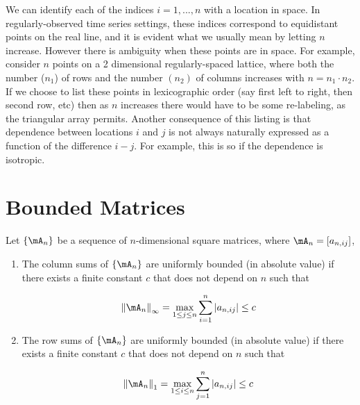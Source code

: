 We can identify each of the indices $i = 1,...,n$ with a location in space. In regularly-observed time series settings, these indices correspond to equidistant points on the real line, and it is evident what we usually mean by letting $n$ increase. However there is ambiguity when these points are in space. For example, consider $n$ points on a 2 dimensional regularly-spaced lattice, where both the number ($n_1$) of rows and the number $(n_2)$ of columns increases with $n=n_1\cdot n_2$. If we choose to list these points in lexicographic order (say first left to right, then second row, etc) then as $n$ increases there would have to be some re-labeling, as the triangular array permits. Another consequence of this listing is that dependence between locations $i$ and $j$ is not always naturally expressed as a function of the difference $i-j$. For example, this is so if the dependence is isotropic. 


\section{Bounded Matrices}

\begin{definition}\label{def:Bounded_Matrices}
Let $\left\lbrace \mA_n \right\rbrace$ be a sequence of $n$-dimensional square matrices, where $\mA_n = \left[a_{n,ij}\right]$,
  \begin{enumerate}
    \item The column sums of $\left\lbrace \mA_n \right\rbrace$ are uniformly bounded (in absolute value) if there exists a finite constant $c$ that does not depend on $n$ such that 
    
    \begin{equation*}
      \left\|\mA_n\right\|_{\infty} = \max_{1 \leq j\leq n}\sum_{i = 1}^n\left|a_{n, ij}\right| \leq c
    \end{equation*}
     \item The row sums of $\left\lbrace \mA_n \right\rbrace$ are uniformly bounded (in absolute value) if there exists a finite constant $c$ that does not depend on $n$ such that 
    
    \begin{equation*}
      \left\|\mA_n\right\|_1 = \max_{1 \leq i\leq n}\sum_{j = 1}^n\left|a_{n, ij}\right| \leq c
    \end{equation*}
  \end{enumerate}
\end{definition}

